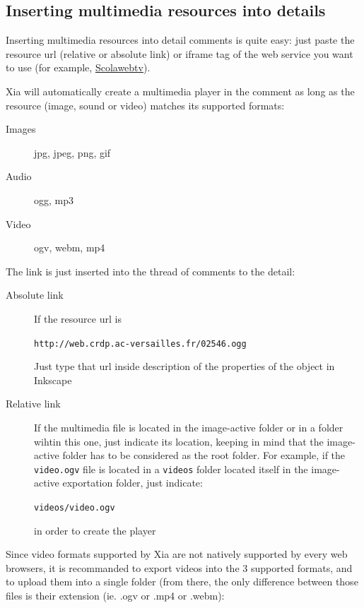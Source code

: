 \subsection{Inserting multimedia resources into details}\label{enrichissement_multimedia}

Inserting multimedia resources into detail comments is quite easy: just paste 
the resource url (relative or absolute link) or iframe tag of the web service 
you want to use (for example, \href{https://scolawebtv.crdp-versailles.fr/}
{Scolawebtv}).

Xia will automatically create a multimedia player in the comment as long as 
the resource (image, sound or video) matches its supported formats: 
\begin{description}
 \item [Images] jpg, jpeg, png, gif
 \item [Audio] ogg, mp3
 \item [Video] ogv, webm, mp4
\end{description}

The link is just inserted into the thread of comments to the detail:
\begin{description}
 \item[Absolute link] If the resource url is
 
 \verb|http://web.crdp.ac-versailles.fr/02546.ogg|
 
 Just type that url inside description of the properties of the object in 
 Inkscape  \item [Relative link] If the multimedia file is located in the image-active 
 folder or in a folder wihtin this one, just indicate its location, keeping in 
 mind that the image-active folder has to be considered as the root folder. 
 For example, if the \verb|video.ogv| file is located in a \verb|videos| 
 folder located itself in the image-active exportation folder, just indicate:
 
  \verb|videos/video.ogv|
 
  in order to create the player
\end{description}

Since video formats supported by Xia are not natively supported by every web 
browsers, it is recommanded to export videos into the 3 supported formats, 
and to upload them into a single folder (from there, the only difference 
between those files is their extension (ie. .ogv or .mp4 or .webm):\\

